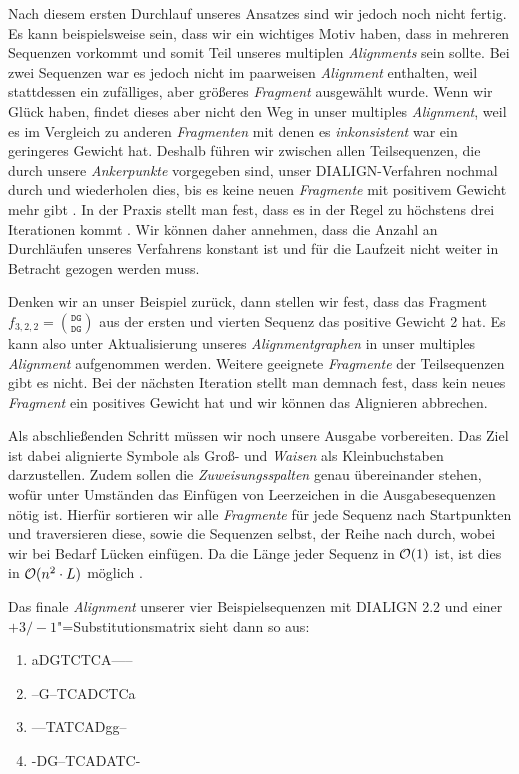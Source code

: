 Nach diesem ersten Durchlauf unseres Ansatzes sind wir jedoch noch nicht fertig. Es kann beispielsweise sein, dass wir ein wichtiges Motiv haben, dass in mehreren Sequenzen vorkommt und somit Teil unseres multiplen \emph{Alignments} sein sollte. Bei zwei Sequenzen war es jedoch nicht im paarweisen \emph{Alignment} enthalten, weil stattdessen ein zufälliges, aber größeres \emph{Fragment} ausgewählt wurde. Wenn wir Glück haben, findet dieses aber nicht den Weg in unser multiples \emph{Alignment}, weil es im Vergleich zu anderen \emph{Fragmenten} mit denen es \emph{inkonsistent} war ein geringeres Gewicht hat. Deshalb führen wir zwischen allen Teilsequenzen, die durch unsere \emph{Ankerpunkte} vorgegeben sind, unser DIALIGN-Verfahren nochmal durch und wiederholen dies, bis es keine neuen \emph{Fragmente} mit positivem Gewicht mehr gibt \citep{mdw96}. In der Praxis stellt man fest, dass es in der Regel zu höchstens drei Iterationen kommt \citep{m99}. Wir können daher annehmen, dass die Anzahl an Durchläufen unseres Verfahrens konstant ist und für die Laufzeit nicht weiter in Betracht gezogen werden muss.

Denken wir an unser Beispiel zurück, dann stellen wir fest, dass das Fragment $f_{3,2,2} = $$ {\texttt{DG}}\choose{\texttt{DG}}$ aus der ersten und vierten Sequenz das positive Gewicht 2 hat. Es kann also unter Aktualisierung unseres \emph{Alignmentgraphen} in unser multiples \emph{Alignment} aufgenommen werden. Weitere geeignete \emph{Fragmente} der Teilsequenzen gibt es nicht. Bei der nächsten Iteration stellt man demnach fest, dass kein neues \emph{Fragment} ein positives Gewicht hat und wir können das Alignieren abbrechen.

Als abschließenden Schritt müssen wir noch unsere Ausgabe vorbereiten. Das Ziel ist dabei alignierte Symbole als Groß- und \emph{Waisen} als Kleinbuchstaben darzustellen. Zudem sollen die \emph{Zuweisungsspalten} genau übereinander stehen, wofür unter Umständen das Einfügen  von Leerzeichen in die Ausgabesequenzen nötig ist. Hierfür sortieren wir alle \emph{Fragmente} für jede Sequenz nach Startpunkten und traversieren diese, sowie die Sequenzen selbst, der Reihe nach durch, wobei wir bei Bedarf Lücken einfügen. Da die Länge jeder Sequenz in $\mathcal{O}(1)$ ist, ist dies in $\mathcal{O}(n^2\cdot L)$ möglich \citep{m99}. 

Das finale \emph{Alignment} unserer vier Beispielsequenzen mit DIALIGN 2.2 und einer $+3/-1$"=Substitutionsmatrix sieht dann so aus:
\ttfamily
\begin{enumerate}[topsep=0pt,itemsep=-1ex,partopsep=1ex,parsep=1ex]
	\item aDGTCTCA-----
	\item --G--TCADCTCa
	\item ---TATCADgg--
	\item -DG--TCADATC-
\end{enumerate}
\normalfont 

